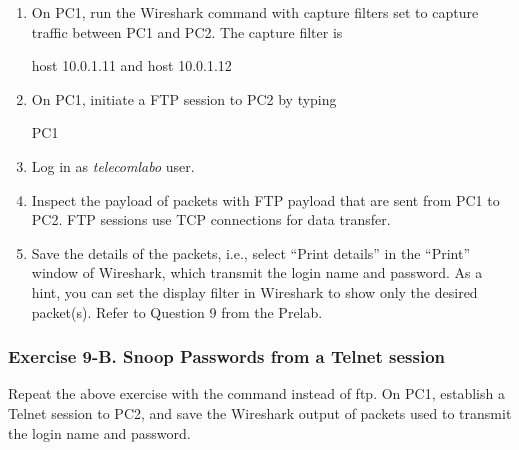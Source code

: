 \begin{enumerate}
	\item On PC1, run the Wireshark command with capture filters set to capture traffic between PC1 and PC2. The capture filter is
		\begin{cmdblock}
	host 10.0.1.11 and host 10.0.1.12
		\end{cmdblock}
	\item On PC1, initiate a FTP session to PC2 by typing
		\begin{cmdblock}
	PC1%
		\end{cmdblock}
	\item Log in as \textit{telecomlabo} user.
	\item Inspect the payload of packets with FTP payload that are sent from PC1 to PC2. FTP sessions use TCP connections for data transfer.
	\item Save the details of the packets, i.e., select ``Print details'' in the ``Print'' window of Wireshark, which transmit the login name and password. As a hint, you can set the display filter in Wireshark to show only the desired packet(s). Refer to Question 9 from the Prelab.
\end{enumerate}

\begin{questions}
\end{questions}


\subsubsection*{Exercise 9-B. Snoop Passwords from a Telnet session}

Repeat the above exercise with the  command instead of ftp. On PC1, establish a Telnet session to PC2, and save the Wireshark output of packets used to transmit the login name and password.

\begin{questions}
\end{questions}

